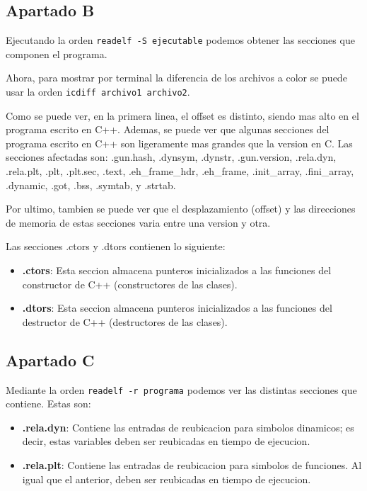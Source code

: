 \documentclass{article}
\begin{document}
\subsection*{Apartado B}

Ejecutando la orden \verb|readelf -S ejecutable| podemos obtener las secciones que componen el programa.



Ahora, para mostrar por terminal la diferencia de los archivos a color se puede usar la orden \verb|icdiff archivo1 archivo2|.


Como se puede ver, en la primera linea, el offset es distinto, siendo mas alto en el programa escrito en C++. Ademas, se puede ver que algunas secciones del programa escrito en C++ son ligeramente mas grandes que la version en C. Las secciones afectadas son: .gun.hash, .dynsym, .dynstr, .gun.version, .rela.dyn, .rela.plt, .plt, .plt.sec, .text, .eh\_frame\_hdr, .eh\_frame, .init\_array, .fini\_array, .dynamic, .got, .bss, .symtab, y .strtab.

Por ultimo, tambien se puede ver que el desplazamiento (offset) y las direcciones de memoria de estas secciones varia entre una version y otra.


\bigskip

Las secciones .ctors y .dtors contienen lo siguiente:

\begin{itemize}
    \item \textbf{.ctors}: Esta seccion almacena punteros inicializados a las funciones del constructor de C++ (constructores de las clases).
    \item \textbf{.dtors}: Esta seccion almacena punteros inicializados a las funciones del destructor de C++ (destructores de las clases).
\end{itemize}


\subsection*{Apartado C}

Mediante la orden \verb|readelf -r programa| podemos ver las distintas secciones que contiene. Estas son:

\begin{itemize}
    \item \textbf{.rela.dyn}: Contiene las entradas de reubicacion para simbolos dinamicos; es decir, estas variables deben ser reubicadas en tiempo de ejecucion.
    \item \textbf{.rela.plt}: Contiene las entradas de reubicacion para simbolos de funciones. Al igual que el anterior, deben ser reubicadas en tiempo de ejecucion.
\end{itemize}
\end{document}
